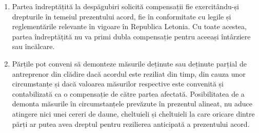 \begin{multicols}{2}
\begin{enumerate}
\item Partea îndreptățită la despăgubiri solicită compensații fie exercitându-și drepturile în temeiul prezentului acord, fie în conformitate cu legile și reglementările relevante în vigoare în Republica Letonia. Cu toate acestea, partea îndreptățită nu va primi dubla compensație pentru aceeași întârziere sau încălcare.
\item Părțile pot conveni să demonteze măsurile deținute sau deținute parțial de antreprenor din clădire dacă acordul este reziliat din timp, din cauza unor circumstanțe și dacă valoarea măsurilor respective este convenită și contabilizată ca o compensație de către partea afectată. Posibilitatea de a demonta măsurile în circumstanțele prevăzute în prezentul alineat, nu aduce atingere nici unei cereri de daune, cheltuieli și cheltuieli la care oricare dintre părți ar putea avea dreptul pentru rezilierea anticipată a prezentului acord.
\end{enumerate}


\end{multicols}
